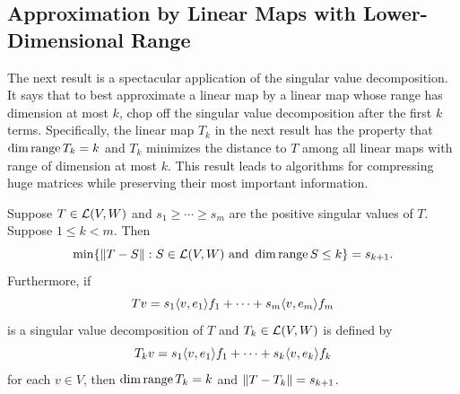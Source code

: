 \subsection{Approximation by Linear Maps with Lower-Dimensional Range}

The next result is a spectacular application of the singular value
decomposition. It says that to best approximate a linear map by a linear map
whose range has dimension at most $k$, chop off the singular value
decomposition after the first $k$ terms. Specifically, the linear map $T_k$ in
the next result has the property that $\operatorname{dim}\operatorname{range} T_k=k$ and $T_k$ minimizes
the distance to $T$ among all linear maps with range of dimension at most $k$.
This result leads to algorithms for compressing huge matrices while preserving
their most important information.

\begin{result}\label{ax:7.92}
Suppose $T\in\mathcal{L}(V,W)$ and $s_1\ge\cdots\ge s_m$ are the positive singular
values of $T$. Suppose $1\le k<m$. Then
\[ \min\{\lVert T-S \rVert : S\in\mathcal{L}(V,W) \text{ and } \operatorname{dim}\operatorname{range} S\le k\} = s_{k+1}. \]
Furthermore, if
\[ Tv = s_1\langle v, e_1 \rangle f_1+\cdots+s_m\langle v, e_m \rangle f_m \]
is a singular value decomposition of $T$ and $T_k\in\mathcal{L}(V,W)$ is defined by
\[ T_kv = s_1\langle v, e_1 \rangle f_1+\cdots+s_k\langle v, e_k \rangle f_k \]
for each $v\in V$, then $\operatorname{dim}\operatorname{range} T_k=k$ and $\lVert T-T_k \rVert=s_{k+1}$.
\end{result}

